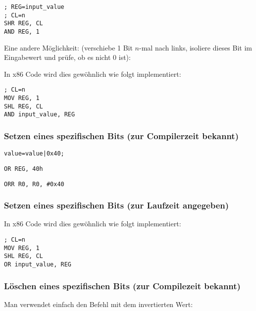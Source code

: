 \begin{lstlisting}[caption=x86,style=customasmx86]
; REG=input_value
; CL=n
SHR REG, CL
AND REG, 1
\end{lstlisting}
Eine andere Möglichkeit: (verschiebe 1 Bit $n$-mal nach links, isoliere dieses
Bit im Eingabewert und prüfe, ob es nicht 0 ist):



In x86 Code wird dies gewöhnlich wie folgt implementiert:

\begin{lstlisting}[caption=x86,style=customasmx86]
; CL=n
MOV REG, 1
SHL REG, CL
AND input_value, REG
\end{lstlisting}

\subsubsection{Setzen eines spezifischen Bits (zur Compilerzeit bekannt)}

\begin{lstlisting}[caption=\CCpp]
value=value|0x40;
\end{lstlisting}

\begin{lstlisting}[caption=x86,style=customasmx86]
OR REG, 40h
\end{lstlisting}

\begin{lstlisting}[caption=ARM (\ARMMode) and ARM64,style=customasmARM]
ORR R0, R0, #0x40
\end{lstlisting}

\subsubsection{Setzen eines spezifischen Bits (zur Laufzeit angegeben)}



In x86 Code wird dies gewöhnlich wie folgt implementiert:

\begin{lstlisting}[caption=x86,style=customasmx86]
; CL=n
MOV REG, 1
SHL REG, CL
OR input_value, REG
\end{lstlisting}

\subsubsection{Löschen eines spezifischen Bits (zur Compilezeit bekannt)}
Man verwendet einfach den \AND Befehl mit dem invertierten Wert:

